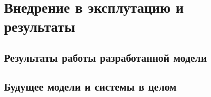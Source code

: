 \section{Внедрение в эксплутацию и результаты}

\subsection{Результаты работы разработанной модели}

\subsection{Будущее модели и системы в целом}

\clearpage